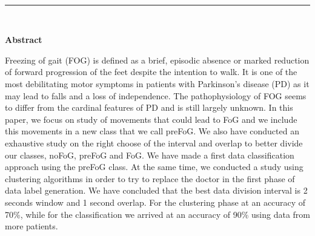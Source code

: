 
\cleardoublepage
\thispagestyle{empty}

\leavevmode \\[0.86cm]
\begin{center}
\rule{\textwidth}{.4pt} \\
\end{center}
{\LARGE\textbf{Abstract}}
\vspace{1cm}

Freezing of gait (FOG) is defined as a brief, episodic absence or marked reduction of forward progression of the feet despite the intention to walk. It is one of the most debilitating motor symptoms in patients with Parkinson's disease (PD) as it may lead to falls and a loss of independence. The pathophysiology of FOG seems to differ from the cardinal features of PD and is still largely unknown. In this paper, we focus on study of movements that could lead to FoG and we include this movements in a new class that we call preFoG. We also have conducted an exhaustive study on the right choose of the interval and overlap to better divide our classes, noFoG, preFoG and FoG. We have made a first data classification approach using the preFoG class. At the same time, we conducted a study using clustering algorithms in order to try to replace the doctor in the first phase of data label generation. We have concluded that the best data division interval is 2 seconds window and 1 second overlap. For the clustering phase at an accuracy of 70\%, while for the classification we arrived at an accuracy of 90\% using data from more patients.

\clearpage
\thispagestyle{empty}